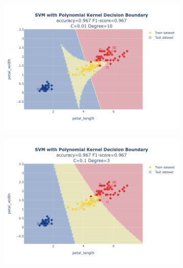 \documentclass{article}
\begin{document}
\begin{figure}
\begin{subfigure}{0.3\textwidth}
        \includegraphics[scale=.13]{images/implementation/q1/polynomial_kernel/petal_length_petal_width_0.01_10.png}
    \end{subfigure}
    \newline
    \begin{subfigure}{0.3\textwidth}
        \centering
        \includegraphics[scale=.13]{images/implementation/q1/polynomial_kernel/petal_length_petal_width_0.1_3.png}
    \end{subfigure}
    \hfill
    \begin{subfigure}{0.3\textwidth}
        \centering

\end{subfigure}
\end{figure}
\end{document}
